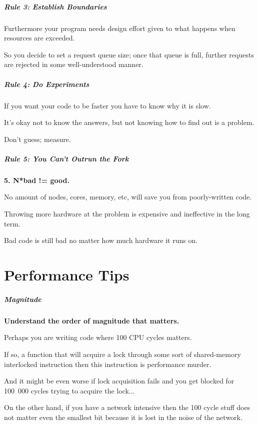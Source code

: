 \begin{frame}
\frametitle{Rule 3: Establish Boundaries}

Furthermore your program needs design effort given to what happens when resources are exceeded. 

So you decide to set a request queue size; once that queue is full, further requests are rejected in some well-understood manner. 


\end{frame}



\begin{frame}
\frametitle{Rule 4: Do Experiments}

If you want your code to be faster you have to know why it is slow. 

It's okay not to know the answers, but not knowing how to find out is a problem. 

Don't guess; measure.

\end{frame}



\begin{frame}
\frametitle{Rule 5: You Can't Outrun the Fork}

\textbf{5. N*bad != good.}

No amount of nodes, cores, memory, etc, will save you from poorly-written code.

Throwing more hardware at the problem is expensive and ineffective in the long term. 

Bad code is still bad no matter how much hardware it runs on. 

\end{frame}

\part{Performance Tips}

\begin{frame}
\partpage
\end{frame}



\begin{frame}
\frametitle{Magnitude}

\textbf{Understand the order of magnitude that matters.} 

Perhaps you are writing code where 100 CPU cycles matters. 

If so, a function that will acquire a lock through some sort of shared-memory interlocked instruction then this instruction is performance murder. 

And it might be even worse if lock acquisition fails and you get blocked for 100~000 cycles trying to acquire the lock... 

On the other hand, if you have a network intensive then the 100 cycle stuff does not matter even the smallest bit because it is lost in the noise of the network.

\end{frame}



